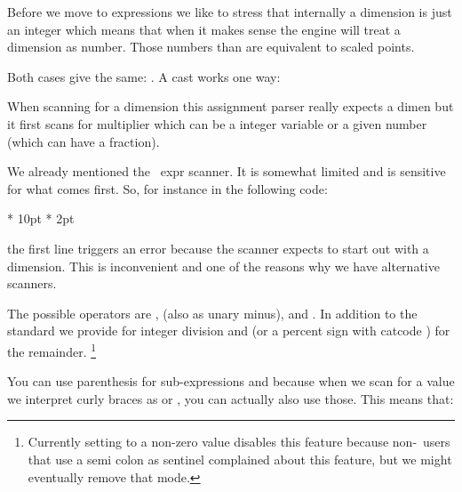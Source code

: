 Before we move to expressions we like to stress that internally a dimension is
just an integer which means that when it makes sense the engine will treat a
dimension as number. Those numbers than are equivalent to scaled points.

\startbuffer
[\number\dimexpr 5sp \relax]
[\number\numexpr 5   \relax]
\stopbuffer

\typebuffer[option=TEX]

Both cases give the same: \inlinebuffer. A cast works one way:

\starttyping[option=TEX]
\scratchcounter                 \scratchdimen   %
\scratchcounter \plusone        \scratchdimen   %
\scratchcounter \plusone        \scratchcounter %
\scratchdimen   \scratchcounter \onepoint       %
\scratchdimen   \scratchcounter                 %
\stoptyping

When scanning for a dimension this assignment parser really expects a dimen but
it first scans for multiplier which can be a integer variable or a given number
(which can have a fraction).

\stopsectionlevel

\startsectionlevel[title={\type {\...expr}}]

We already mentioned the \ETEX\ expr scanner. It is somewhat limited and
is sensitive for what comes first. So, for instance in the following code:

\starttyping[option=TEX]
\scratchdimen {} * 10pt \relax
\scratchdimen {} * 2pt \relax
\stoptyping

the first line triggers an error because the scanner expects to start out with a
dimension. This is inconvenient and one of the reasons why we have alternative
scanners.

The possible operators are \type {+}, \type {-} (also as unary minus), \type {*}
and \type {/}. In addition to the standard we provide \type {:} for integer
division and \type {;} (or a percent sign with catcode ) for the
remainder. \footnote {Currently setting \type {\etexexprmode} to a non-zero value
disables this feature because non-\CONTEXT\ users that use a semi colon as
sentinel complained about this feature, but we might eventually remove that
mode.}

You can use parenthesis for sub-expressions and because when we scan for a value
we interpret curly braces as \type {\numexpression} or \type {\dimexpression},
you can actually also use those. This means that:

